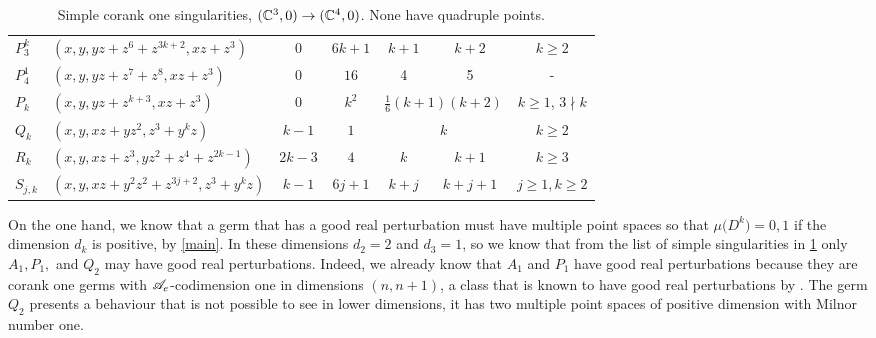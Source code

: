 \documentclass[a4paper,12pt]{amsart}
\begin{document}
\begin{table}
{\begin{tabular}{l|l|cc|cc|c}
 $P_3^k$   & $(x,y,yz+z^6+z^{3k+2},xz+z^3)$            &$ 0        $  &$ 6k+1 $      &$ k+1         $            & $k+2       $      & $k\geq2$                                           \\
 $P_4^1$   & $(x,y,yz+z^7+z^8,xz+z^3)$                 &$ 0       $   &$ 16 $        & 4                       & 5               & -                                                  \\
 $P_k$     & $(x,y,yz+z^{k+3},xz+z^3)$                 &$ 0      $    &$ k^2   $     & \multicolumn{2}{c|}{$\frac{1}{6}(k+1)(k+2)$} & $k\geq1$, $3\nmid k$                               \\
 $Q_k$     & $(x,y,xz+yz^2,z^3+y^kz)$                  & $k-1     $   & $1$          & \multicolumn{2}{c|}{$k$}                     & $k\geq2$                                           \\
 $R_k$     & $(x,y,xz+z^3,yz^2+z^4+z^{2k-1})$          & $2k-3    $   &$ 4   $       &$ k  $                     & $k+1 $            & $k\geq3$                                           \\
 $S_{j,k}$ & $(x,y,xz+y^2z^2+z^{3j+2},z^3+y^kz)$       &$ k-1   $     & $6j+1   $    & $k+j$                     & $k+j+1 $          & $j\geq1,k\geq2$      
\end{tabular}
}
\caption{Simple corank one singularities, $(\mathbb{C}^3,0)\to(\mathbb{C}^4,0)$. None have quadruple points.}
\label{tab:simplec3c4}
\end{table}

On the one hand, we know that a germ that has a good real perturbation must have multiple point spaces so that $\mu\big(D^k\big)=0,1$ if the dimension $d_k$ is positive, by \cref{main}. In these dimensions $d_2=2$ and $d_3=1$, so we know that from the list of simple singularities in \cref{tab:simplec3c4} only $A_1, P_1,$ and $Q_2$ may have good real perturbations. Indeed, we already know that $A_1$ and $P_1$ have good real perturbations because they are corank one germs with $\mathscr{A}_e$-codimension one in dimensions $(n,n+1)$, a class that is known to have good real perturbations by \cite[Theorem 7.3]{Cooper2002}. The germ $Q_2$ presents a behaviour that is not possible to see in lower dimensions, it has two multiple point spaces of positive dimension with Milnor number one. 
\end{document}
